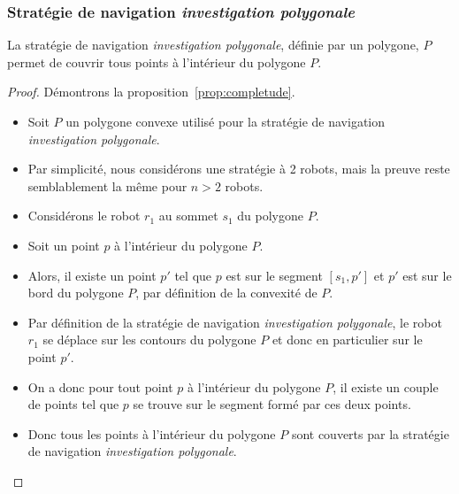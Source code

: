 \documentclass[francais,RandD]{rapportPFE}
\begin{document}
			\subsubsection*{Stratégie de navigation \textit{investigation polygonale}}
				\begin{Proposition}
					La stratégie de navigation \textit{investigation polygonale}, définie par un polygone, $P$ permet de couvrir tous points à l'intérieur du polygone $P$.
					\label{prop:completude}
				\end{Proposition}
				\begin{proof}
					Démontrons la proposition~\ref{prop:completude}.
					\begin{itemize}
						\item Soit $P$ un polygone convexe utilisé pour la stratégie de navigation \textit{investigation polygonale}.
						\item Par simplicité, nous considérons une stratégie à 2 robots, mais la preuve reste semblablement la même pour $n > 2$ robots.
						\item Considérons le robot $r_1$ au sommet $s_1$ du polygone $P$.
						\item Soit un point $p$ à l'intérieur du polygone $P$.
						\item Alors, il existe un point $p'$ tel que $p$ est sur le segment $[s_1, p']$ et $p'$ est sur le bord du polygone $P$, par définition de la convexité de $P$.
						\item Par définition de la stratégie de navigation \textit{investigation polygonale}, le robot $r_1$ se déplace sur les contours du polygone $P$ et donc en particulier sur le point $p'$.
						\item On a donc pour tout point $p$ à l'intérieur du polygone $P$, il existe un couple de points tel que $p$ se trouve sur le segment formé par ces deux points.
						\item Donc tous les points à l'intérieur du polygone $P$ sont couverts par la stratégie de navigation \textit{investigation polygonale}.
					\end{itemize}
				\end{proof}
\end{document}
